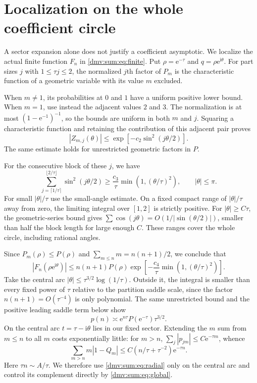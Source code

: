 \documentclass[11pt,letterpaper]{article}
\numberwithin{equation}{section}
\theoremstyle{definition}\newtheorem{definition}[theorem]{Definition}
\theoremstyle{remark}\newtheorem{remark}[theorem]{Remark}
\newcommand{\ii}{\mathrm i}
\newcommand{\ee}{\mathrm e}
\begin{document}
\section{Localization on the whole coefficient circle}\label{dmv:sum:sec:circle}
A sector expansion alone does not justify a coefficient asymptotic. We localize the actual finite function $F_n$ in \eqref{dmv:sum:eq:finite}. Put $\rho=\ee^{-\tau}$ and $q=\rho\ee^{\ii\theta}$. For part sizes $j$ with $1\le\tau j\le2$, the normalized $j$th factor of $P_m$ is the characteristic function of a geometric variable with its value $m$ excluded.

When $m\ne1$, its probabilities at $0$ and $1$ have a uniform positive lower bound. When $m=1$, use instead the adjacent values $2$ and $3$. The normalization is at most $(1-\ee^{-1})^{-1}$, so the bounds are uniform in both $m$ and $j$. Squaring a characteristic function and retaining the contribution of this adjacent pair proves
\begin{equation}\label{dmv:sum:eq:atom}
 |Z_{m,j}(\theta)|\le\exp[-c_2\sin^2(j\theta/2)].
\end{equation}
The same estimate holds for unrestricted geometric factors in $P$.

For the consecutive block of these $j$, we have
\begin{equation}\label{dmv:sum:eq:block}
 \sum_{j=\lceil1/\tau\rceil}^{\lfloor2/\tau\rfloor}\sin^2(j\theta/2)
 \ge\frac{c_3}\tau\min(1,(\theta/\tau)^2),\qquad |\theta|\le\pi.
\end{equation}
For small $|\theta|/\tau$ use the small-angle estimate. On a fixed compact range of $|\theta|/\tau$ away from zero, the limiting integral over $[1,2]$ is strictly positive. For $|\theta|\ge C\tau$, the geometric-series bound gives $\sum\cos(j\theta)=O(1/|\sin(\theta/2)|)$, smaller than half the block length for large enough $C$. These ranges cover the whole circle, including rational angles.

Since $P_m(\rho)\le P(\rho)$ and $\sum_{m\le n}m=n(n+1)/2$, we conclude that
\begin{equation}\label{dmv:sum:eq:global}
 |F_n(\rho\ee^{\ii\theta})|\le n(n+1)P(\rho)
       \exp\left[-\frac{c_4}\tau\min(1,(\theta/\tau)^2)\right].
\end{equation}
Take the central arc $|\theta|\le\tau^{3/2}\log(1/\tau)$. Outside it, the integral is smaller than every fixed power of $\tau$ relative to the partition saddle scale, since the factor $n(n+1)=O(\tau^{-4})$ is only polynomial. The same unrestricted bound and the positive leading saddle term below show
\[
 p(n)\asymp\ee^{n\tau}P(\ee^{-\tau})\tau^{3/2}.
\]
On the central arc $t=\tau-\ii\theta$ lies in our fixed sector. Extending the $m$ sum from $m\le n$ to all $m$ costs exponentially little: for $m>n$, $\sum_j|p_{jm}|\le C\ee^{-\tau m}$, whence
\begin{equation}\label{dmv:sum:eq:mextend}
 \sum_{m>n}m|1-Q_m|\le C(n/\tau+\tau^{-2})\ee^{-\tau n}.
\end{equation}
Here $\tau n\sim A/\tau$. We therefore use \eqref{dmv:sum:eq:radial} only on the central arc and control its complement directly by \eqref{dmv:sum:eq:global}.
\end{document}
